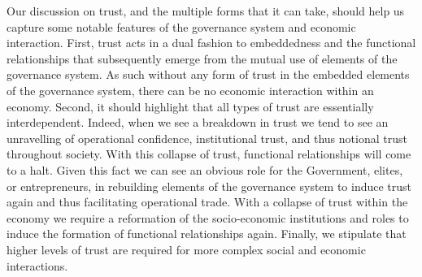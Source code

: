 \begin{subappendices}
Our discussion on trust, and the multiple forms that it can take, should help us capture some notable features of the governance system and economic interaction. First, trust acts in a dual fashion to embeddedness and the functional relationships that subsequently emerge from the mutual use of elements of the governance system. As such without any form of trust in the embedded elements of the governance system, there can be no economic interaction within an economy. Second, it should highlight that all types of trust are essentially interdependent. Indeed, when we see a breakdown in trust we tend to see an unravelling of operational confidence, institutional trust, and thus notional trust throughout society. With this collapse of trust, functional relationships will come to a halt. Given this fact we can see an obvious role for the Government, elites, or entrepreneurs, in rebuilding elements of the governance system to induce trust again and thus facilitating operational trade. With a collapse of trust within the economy we require a reformation of the socio-economic institutions and roles to induce the formation of functional relationships again. Finally, we stipulate that higher levels of trust are required for more complex social and economic interactions. 

\end{subappendices}


















